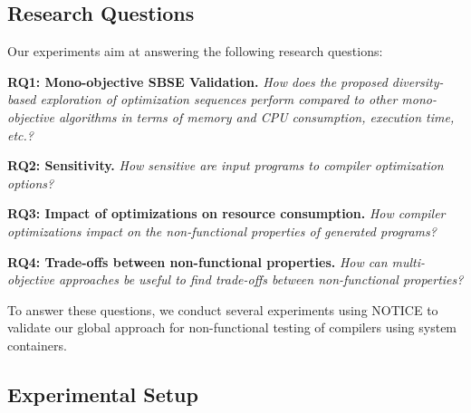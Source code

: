 \subsection{Research Questions}
Our experiments aim at answering the following research questions:

\textbf{RQ1: Mono-objective SBSE Validation.} 
\textit{How does the proposed diversity-based exploration of optimization sequences perform compared to other mono-objective algorithms in terms of memory and CPU consumption, execution time, etc.?} 


\textbf{RQ2: Sensitivity.} 
\textit{How sensitive are input programs to compiler optimization options?}


\textbf{RQ3: Impact of optimizations on resource consumption.} 
\textit{How compiler optimizations impact on the non-functional properties of generated programs?}


\textbf{RQ4: Trade-offs between non-functional properties.} 
\textit{How can multi-objective approaches be useful to find trade-offs between non-functional properties?}

To answer these questions, we conduct several experiments using NOTICE to validate our global approach for non-functional testing of compilers using system containers.


\subsection{Experimental Setup}
